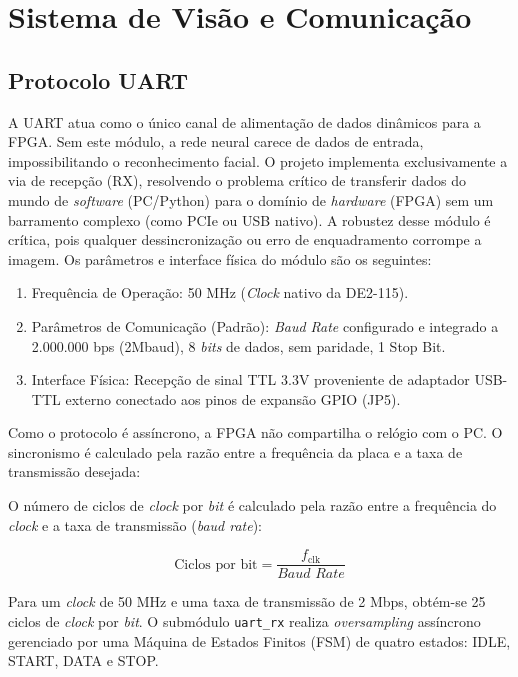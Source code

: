 \chapter{Sistema de Visão e Comunicação}
\section{Protocolo UART}
A UART atua como o único canal de alimentação de dados dinâmicos para a FPGA. Sem este módulo, a rede neural carece de dados de entrada, impossibilitando o reconhecimento facial. O projeto implementa exclusivamente a via de recepção (RX), resolvendo o problema crítico de transferir dados do mundo de \textit{software} (PC/Python) para o domínio de \textit{hardware} (FPGA) sem um barramento complexo (como PCIe ou USB nativo). A robustez desse módulo é crítica, pois qualquer dessincronização ou erro de enquadramento corrompe a imagem. 
Os parâmetros e interface física do módulo são os seguintes:
\begin{enumerate}[nosep]
    \item Frequência de Operação: 50 MHz (\textit{Clock} nativo da DE2-115).
    \item Parâmetros de Comunicação (Padrão): \textit{Baud Rate} configurado e integrado a 2.000.000 bps (2Mbaud), 8 \textit{bits}  de dados, sem paridade, 1 Stop Bit.
    \item Interface Física: Recepção de sinal TTL 3.3V proveniente de adaptador USB-TTL externo conectado aos pinos de expansão GPIO (JP5).
\end{enumerate}

Como o protocolo é assíncrono, a FPGA não compartilha o relógio com o PC. O sincronismo é calculado pela razão entre a frequência da placa e a taxa de transmissão desejada:

O número de ciclos de \textit{clock} por \textit{bit} é calculado pela razão entre a frequência do \textit{clock} e a taxa de transmissão (\textit{baud rate}):

$$ \text{Ciclos por bit} = \frac{f_{\text{clk}}}{\textit{Baud Rate}} $$

Para um \textit{clock} de 50 MHz e uma taxa de transmissão de 2 Mbps, obtém-se 25 ciclos de \textit{clock} por \textit{bit}.
O submódulo \texttt{uart\_rx} realiza \textit{oversampling} assíncrono gerenciado por uma Máquina de Estados Finitos (FSM) de quatro estados: IDLE, START, DATA e STOP.

